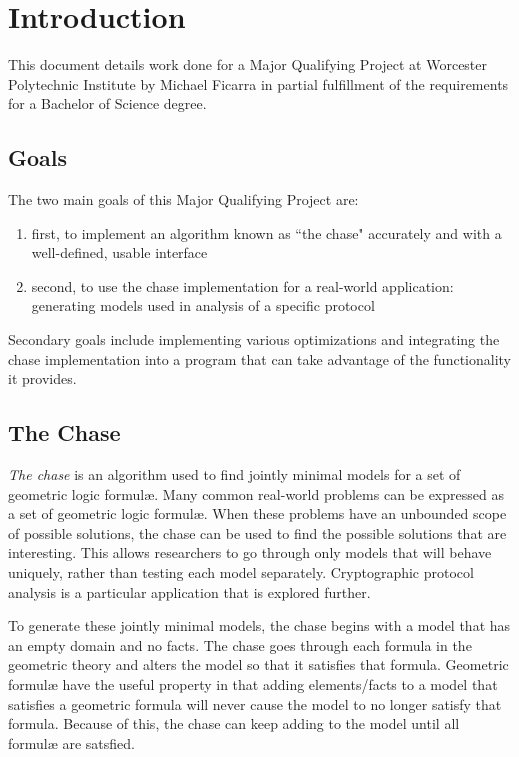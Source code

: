 \section{Introduction}

	This document details work done for a Major Qualifying Project at Worcester
	Polytechnic Institute by Michael Ficarra in partial fulfillment of the
	requirements for a Bachelor of Science degree.

	\subsection{Goals}

		The two main goals of this Major Qualifying Project are:

		\begin{enumerate}
		\item first, to implement an algorithm known as ``the chase" accurately
		and with a well-defined, usable interface
		\item second, to use the chase implementation for a real-world
		application: generating models used in analysis of a specific protocol
		\end{enumerate}

		Secondary goals include implementing various optimizations and
		integrating the chase implementation into a program that can take
		advantage of the functionality it provides.

	\subsection{The Chase}

		\emph{The chase} is an algorithm used to find jointly minimal models
		for a set of geometric logic formul{\ae}. Many common real-world
		problems can be expressed as a set of geometric logic formul{\ae}.
		When these problems have an unbounded scope of possible solutions, the
		chase can be used to find the possible solutions that are interesting.
		This allows researchers to go through only models that will behave
		uniquely, rather than testing each model separately. Cryptographic
		protocol analysis is a particular application that is explored further.

		To generate these jointly minimal models, the chase begins with a model
		that has an empty domain and no facts. The chase goes through each
		formula in the geometric theory and alters the model so that it
		satisfies that formula.  Geometric formul{\ae} have the useful property
		in that adding elements/facts to a model that satisfies a geometric
		formula will never cause the model to no longer satisfy that formula.
		Because of this, the chase can keep adding to the model until all
		formul{\ae} are satsfied.

